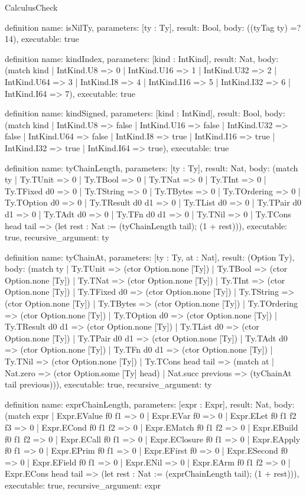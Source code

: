 \begin{lexlean}{CalculusCheck}
\begin{semanticmodule}
definition{
  name: isNilTy,
  parameters: [ty : Ty],
  result: Bool,
  body: ((tyTag ty) =? 14),
  executable: true
}

definition{
  name: kindIndex,
  parameters: [kind : IntKind],
  result: Nat,
  body: (match kind
    | IntKind.U8 => 0
    | IntKind.U16 => 1
    | IntKind.U32 => 2
    | IntKind.U64 => 3
    | IntKind.I8 => 4
    | IntKind.I16 => 5
    | IntKind.I32 => 6
    | IntKind.I64 => 7),
  executable: true
}

definition{
  name: kindSigned,
  parameters: [kind : IntKind],
  result: Bool,
  body: (match kind
    | IntKind.U8 => false
    | IntKind.U16 => false
    | IntKind.U32 => false
    | IntKind.U64 => false
    | IntKind.I8 => true
    | IntKind.I16 => true
    | IntKind.I32 => true
    | IntKind.I64 => true),
  executable: true
}

definition{
  name: tyChainLength,
  parameters: [ty : Ty],
  result: Nat,
  body: (match ty
    | Ty.TUnit => 0
    | Ty.TBool => 0
    | Ty.TNat => 0
    | Ty.TInt => 0
    | Ty.TFixed d0 => 0
    | Ty.TString => 0
    | Ty.TBytes => 0
    | Ty.TOrdering => 0
    | Ty.TOption d0 => 0
    | Ty.TResult d0 d1 => 0
    | Ty.TList d0 => 0
    | Ty.TPair d0 d1 => 0
    | Ty.TAdt d0 => 0
    | Ty.TFn d0 d1 => 0
    | Ty.TNil => 0
    | Ty.TCons head tail => (let rest : Nat := (tyChainLength tail); (1 + rest))),
  executable: true,
  recursive_argument: ty
}

definition{
  name: tyChainAt,
  parameters: [ty : Ty, at : Nat],
  result: (Option Ty),
  body: (match ty
    | Ty.TUnit => (ctor Option.none [Ty])
    | Ty.TBool => (ctor Option.none [Ty])
    | Ty.TNat => (ctor Option.none [Ty])
    | Ty.TInt => (ctor Option.none [Ty])
    | Ty.TFixed d0 => (ctor Option.none [Ty])
    | Ty.TString => (ctor Option.none [Ty])
    | Ty.TBytes => (ctor Option.none [Ty])
    | Ty.TOrdering => (ctor Option.none [Ty])
    | Ty.TOption d0 => (ctor Option.none [Ty])
    | Ty.TResult d0 d1 => (ctor Option.none [Ty])
    | Ty.TList d0 => (ctor Option.none [Ty])
    | Ty.TPair d0 d1 => (ctor Option.none [Ty])
    | Ty.TAdt d0 => (ctor Option.none [Ty])
    | Ty.TFn d0 d1 => (ctor Option.none [Ty])
    | Ty.TNil => (ctor Option.none [Ty])
    | Ty.TCons head tail => (match at
      | Nat.zero => (ctor Option.some [Ty] head)
      | Nat.succ previous => (tyChainAt tail previous))),
  executable: true,
  recursive_argument: ty
}

definition{
  name: exprChainLength,
  parameters: [expr : Expr],
  result: Nat,
  body: (match expr
    | Expr.EValue f0 f1 => 0
    | Expr.EVar f0 => 0
    | Expr.ELet f0 f1 f2 f3 => 0
    | Expr.ECond f0 f1 f2 => 0
    | Expr.EMatch f0 f1 f2 => 0
    | Expr.EBuild f0 f1 f2 => 0
    | Expr.ECall f0 f1 => 0
    | Expr.EClosure f0 f1 => 0
    | Expr.EApply f0 f1 => 0
    | Expr.EPrim f0 f1 => 0
    | Expr.EFirst f0 => 0
    | Expr.ESecond f0 => 0
    | Expr.EField f0 f1 => 0
    | Expr.ENil => 0
    | Expr.EArm f0 f1 f2 => 0
    | Expr.ECons head tail => (let rest : Nat := (exprChainLength tail); (1 + rest))),
  executable: true,
  recursive_argument: expr
}


\end{semanticmodule}
\end{lexlean}
